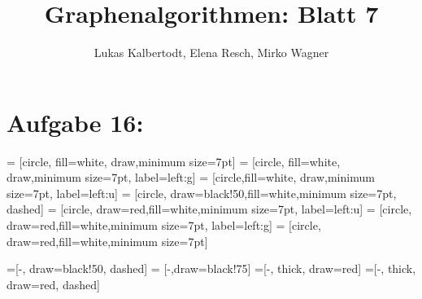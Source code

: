 \documentclass[11pt]{scrartcl} %
\title{Graphenalgorithmen: Blatt 7}
\author{Lukas Kalbertodt, Elena Resch, Mirko Wagner}
\begin{document}
\maketitle
\section*{Aufgabe 16:}
\newcommand{\stepsep}{\\ \multicolumn{2}{c}{\textcolor{lightgray}{\rule{8cm}{0.4pt}}} \\}

 = [circle, fill=white, draw,minimum size=7pt]
 = [circle, fill=white, draw,minimum size=7pt, label=left:g]
 = [circle,fill=white, draw,minimum size=7pt, label=left:u]
 = [circle, draw=black!50,fill=white,minimum size=7pt, dashed]
 = [circle, draw=red,fill=white,minimum size=7pt,
label=left:u]
 = [circle, draw=red,fill=white,minimum size=7pt,
label=left:g]
 = [circle, draw=red,fill=white,minimum size=7pt]

 =[-, draw=black!50, dashed]
 = [-,draw=black!75]
 =[-, thick, draw=red]
 =[-, thick, draw=red, dashed]

\newcommand{\makeTree}[2]{
  \foreach \pos/\name/\style in {#1} 
    \node [\style] (\name) at \pos {$\name$};
  \foreach \start/\style/\end in {#2} 
    \draw [\style] (\start) -- (\end);
}

\newcommand{\elem}[2]{
  \lbrace {#1},{#2} \rbrace
}
\end{document}
